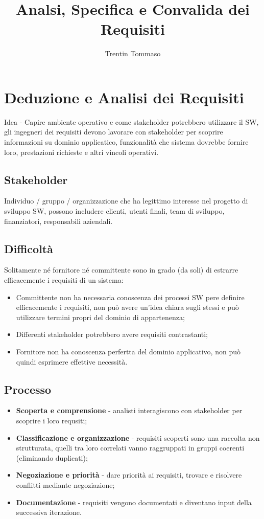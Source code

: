 \documentclass{article}
\title{Analsi, Specifica e Convalida dei Requisiti}
\author{Trentin Tommaso}
\begin{document}
  \maketitle
  \tableofcontents
  \newpage
  \section{Deduzione e Analisi dei Requisiti}
    Idea - Capire ambiente operativo e come stakeholder potrebbero utilizzare il SW, gli ingegneri dei requisiti devono lavorare con stakeholder per scoprire informazioni su dominio applicatico, funzionalità che sistema dovrebbe fornire loro, prestazioni richieste e altri vincoli operativi.
    \subsection{Stakeholder}
      Individuo / gruppo / organizzazione che ha legittimo interesse nel progetto di sviluppo SW, possono includere clienti, utenti finali, team di sviluppo, finanziatori, responsabili aziendali. 
    \subsection{Difficoltà}
      Solitamente né fornitore né committente sono in grado (da soli) di estrarre efficacemente i requisiti di un sistema:
      \begin{itemize}
        \item Committente non ha necessaria conoscenza dei processi SW pere definire efficacemente i requisiti, non può avere un'idea chiara sugli stessi e può utilizzare termini propri del dominio di appartenenza;
        \item Differenti stakeholder potrebbero avere requisiti contrastanti;
        \item Fornitore non ha conoscenza perfertta del dominio applicativo, non può quindi esprimere effettive necessità.
      \end{itemize}
    \subsection{Processo}
      \begin{itemize}
        \item \textbf{Scoperta e comprensione} - analisti interagiscono con stakeholder per scoprire i loro requsiti;
        \item \textbf{Classificazione e organizzazione} - requisiti scoperti sono una raccolta non strutturata, quelli tra loro correlati vanno raggruppati in gruppi coerenti (eliminando duplicati); 
        \item \textbf{Negoziazione e priorità} - dare priorità ai requisiti, trovare e risolvere conflitti mediante negoziazione;
        \item \textbf{Documentazione} - requisiti vengono documentati e diventano input della successiva iterazione.
      \end{itemize}
\end{document}
